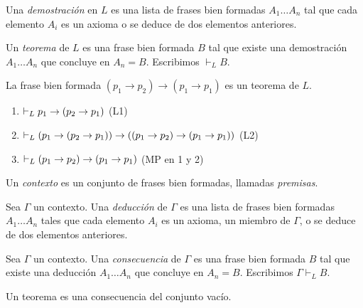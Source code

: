 \begin{definition}
Una \textit{demostración} en $L$ es una lista de frases bien formadas $A_1 \dots A_n$ tal que cada elemento $A_i$ es un axioma o se deduce de dos elementos anteriores.
\end{definition}

\begin{definition}
Un \textit{teorema} de $L$ es una frase bien formada $B$ tal que existe una demostración $A_1 \dots A_n$ que concluye en $A_n = B$. Escribimos $\vdash_L B$.
\end{definition}

\begin{example}
La frase bien formada $(p_1 \to p_2) \to (p_1 \to p_1)$ es un teorema de $L$.

\begin{enumerate}
    \item $\vdash_L p_1 \to (p_2 \to p_1)$ \hfill (L1)
    \item $\vdash_L (p_1 \to (p_2 \to p_1)) \to ((p_1 \to p_2) \to (p_1 \to p_1))$ \hfill (L2)
    \item $\vdash_L (p_1 \to p_2) \to (p_1 \to p_1)$ \hfill (MP en 1 y 2)
\end{enumerate}
\end{example}

\newpage

\begin{definition}
Un \textit{contexto} es un conjunto de frases bien formadas, llamadas \textit{premisas}.
\end{definition}

\begin{definition}
Sea $\Gamma$ un contexto. Una \textit{deducción} de $\Gamma$ es una lista de frases bien formadas $A_1 \dots A_n$ tales que cada elemento $A_i$ es un axioma, un miembro de $\Gamma$, o se deduce de dos elementos anteriores.
\end{definition}

\begin{definition}
Sea $\Gamma$ un contexto. Una \textit{consecuencia} de $\Gamma$ es una frase bien formada $B$ tal que existe una deducción $A_1 \dots A_n$ que concluye en $A_n = B$. Escribimos $\Gamma \vdash_L B$.
\end{definition}

\begin{remark}
Un teorema es una consecuencia del conjunto vacío.
\end{remark}

